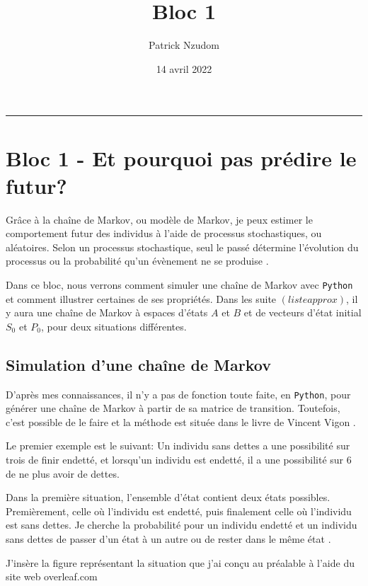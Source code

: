 \documentclass[10pt]{article}
\author{	
	Patrick Nzudom
     }
\title{Bloc 1}
\date{14 avril 2022}
\begin{document}
\maketitle

\rule{\linewidth}{.5pt}

\tableofcontents

\section{Bloc 1 - Et pourquoi pas prédire le futur?}


Grâce à la chaîne de Markov, ou modèle de Markov, je peux estimer le comportement futur des individus à l'aide de processus stochastiques, ou aléatoires. Selon un processus stochastique, seul le passé détermine l'évolution du processus ou la probabilité qu'un évènement ne se produise \cite{Markov}.


Dans ce bloc,  nous verrons comment simuler une chaîne de Markov avec \texttt{Python} et comment illustrer certaines de ses propriétés.  Dans les suite $(listeapprox)$,  il y aura une chaîne de Markov à espaces d'états $A$ et $B$ et de vecteurs d'état initial $S_0$ et $P_0$, pour deux situations différentes.


\subsection{Simulation d'une chaîne de Markov}

D'après mes connaissances, il n'y a pas de fonction toute faite, en \texttt{Python}, pour générer une chaîne de Markov à partir de sa matrice de transition. Toutefois, c'est possible de le faire et la méthode est située dans le livre de Vincent Vigon \cite{Pythonprobastat}.


Le premier exemple est le suivant: Un individu sans dettes a une possibilité sur trois de finir endetté, et lorsqu'un individu est endetté, il a une possibilité sur 6 de ne plus avoir de dettes.


Dans la première situation, l'ensemble d'état contient deux états possibles. Premièrement, celle où l'individu est endetté, puis finalement celle où l'individu est sans dettes. Je cherche la probabilité pour un individu endetté et un individu sans dettes de passer d'un état à un autre ou de rester dans le même état \cite{SituationDette}.

J'insère la figure représentant la situation que j'ai conçu au préalable à l'aide du site web overleaf.com
\end{document}
